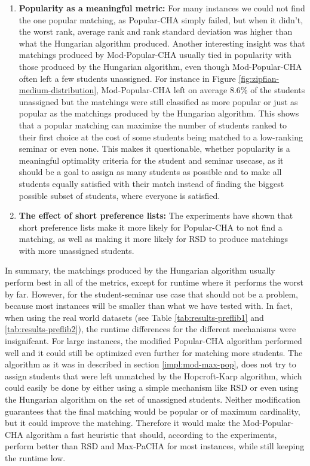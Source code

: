\begin{enumerate}
  \item \textbf{Popularity as a meaningful metric:} For many instances we could not find the one popular matching, as Popular-CHA simply failed, but when it didn't, the worst rank, average rank and rank standard deviation was higher than what the Hungarian algorithm produced. Another interesting insight was that matchings produced by Mod-Popular-CHA usually tied in popularity with those produced by the Hungarian algorithm, even though Mod-Popular-CHA often left a few students unassigned. For instance in Figure \ref{fig:zipfian-medium-distribution}, Mod-Popular-CHA left on average 8.6\% of the students unassigned but the matchings were still classified as more popular or just as popular as the matchings produced by the Hungarian algorithm. This shows that a popular matching can maximize the number of students ranked to their first choice at the cost of some students being matched to a low-ranking seminar or even none. This makes it questionable, whether popularity is a meaningful optimality criteria for the student and seminar usecase, as it should be a goal to assign as many students as possible and to make all students equally satisfied with their match instead of finding the biggest possible subset of students, where everyone is satisfied.
  \item \textbf{The effect of short preference lists:} The experiments have shown that short preference lists make it more likely for Popular-CHA to not find a matching, as well as making it more likely for RSD to produce matchings with more unassigned students.
\end{enumerate}

In summary, the matchings produced by the Hungarian algorithm usually perform best in all of the metrics, except for runtime where it performs the worst by far. However, for the student-seminar use case that should not be a problem, because most instances will be smaller than what we have tested with. In fact, when using the real world datasets (see Table \ref{tab:results-preflib1} and \ref{tab:results-preflib2}), the runtime differences for the different mechanisms were insignifcant. For large instances, the modified Popular-CHA algorithm performed well and it could still be optimized even further for matching more students. The algorithm as it was in described in section \ref{impl:mod-max-pop}, does not try to assign students that were left unmatched by the Hopcroft-Karp algorithm, which could easily be done by either using a simple mechanism like RSD or even using the Hungarian algorithm on the set of unassigned students. Neither modification guarantees that the final matching would be popular or of maximum cardinality, but it could improve the matching. Therefore it would make the Mod-Popular-CHA algorithm a fast heuristic that should, according to the experiments, perform better than RSD and Max-PaCHA for most instances, while still keeping the runtime low.